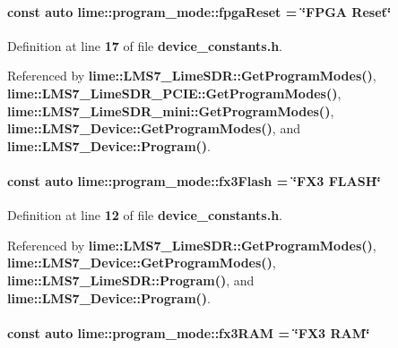 \paragraph[{fpga\+Reset}]{\setlength{\rightskip}{0pt plus 5cm}const auto lime\+::program\+\_\+mode\+::fpga\+Reset = \char`\"{}F\+P\+GA Reset\char`\"{}}\label{namespacelime_1_1program__mode_a04cfb853f915fa91585128137325dfe7}


Definition at line {\bf 17} of file {\bf device\+\_\+constants.\+h}.



Referenced by {\bf lime\+::\+L\+M\+S7\+\_\+\+Lime\+S\+D\+R\+::\+Get\+Program\+Modes()}, {\bf lime\+::\+L\+M\+S7\+\_\+\+Lime\+S\+D\+R\+\_\+\+P\+C\+I\+E\+::\+Get\+Program\+Modes()}, {\bf lime\+::\+L\+M\+S7\+\_\+\+Lime\+S\+D\+R\+\_\+mini\+::\+Get\+Program\+Modes()}, {\bf lime\+::\+L\+M\+S7\+\_\+\+Device\+::\+Get\+Program\+Modes()}, and {\bf lime\+::\+L\+M\+S7\+\_\+\+Device\+::\+Program()}.

\paragraph[{fx3\+Flash}]{\setlength{\rightskip}{0pt plus 5cm}const auto lime\+::program\+\_\+mode\+::fx3\+Flash = \char`\"{}F\+X3 F\+L\+A\+SH\char`\"{}}\label{namespacelime_1_1program__mode_a9799b0fcf7b2d8d8b4f468831a77e03e}


Definition at line {\bf 12} of file {\bf device\+\_\+constants.\+h}.



Referenced by {\bf lime\+::\+L\+M\+S7\+\_\+\+Lime\+S\+D\+R\+::\+Get\+Program\+Modes()}, {\bf lime\+::\+L\+M\+S7\+\_\+\+Device\+::\+Get\+Program\+Modes()}, {\bf lime\+::\+L\+M\+S7\+\_\+\+Lime\+S\+D\+R\+::\+Program()}, and {\bf lime\+::\+L\+M\+S7\+\_\+\+Device\+::\+Program()}.

\paragraph[{fx3\+R\+AM}]{\setlength{\rightskip}{0pt plus 5cm}const auto lime\+::program\+\_\+mode\+::fx3\+R\+AM = \char`\"{}F\+X3 {\bf R\+AM}\char`\"{}}\label{namespacelime_1_1program__mode_a4b448681b8559e72c29a4ce72b97d345}


